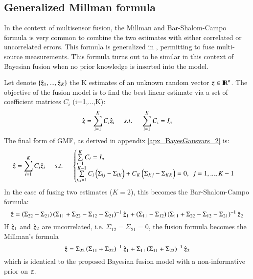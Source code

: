 \subsection{Generalized Millman formula}
In the context of multisensor fusion, the Millman and Bar-Shalom-Campo formula is very common to combine the two estimates with either correlated or uncorrelated errors. This formula is generalized in \cite{shin2006generalized}, permitting to fuse multi-source measurements. This formula turns out to be similar in this context of Bayesian fusion when no prior knowledge is inserted into the model. 

Let denote $ \left\lbrace \hat{\operatorname{\boldsymbol{z}} }_1,...,\hat{\operatorname{\boldsymbol{z}} }_K \right\rbrace  $ the K estimates of an unknown random vector $ \operatorname{\boldsymbol{z}}  \in {\rm I\!R}^n $. The objective of the fusion model is to find the best linear estimate via a set of coefficient matrices $ C_i $ (i=1,...,K):
\begin{equation}
\hat{\operatorname{\boldsymbol{z}} }=\sum\limits_{i=1}^{K}{C_i\hat{\operatorname{\boldsymbol{z}} }_i} \:\:\:\:\:\: s.t. \:\:\:\:\:\: \sum\limits_{i=1}^{K}{C_i}=I_n
\end{equation}
The final form of GMF, as derived in appendix \ref{apx_BayesGausvars_2} is: 
\begin{equation}
\hat{\operatorname{\boldsymbol{z}} }=\sum\limits_{i=1}^{K}{C_i\hat{\operatorname{\boldsymbol{z}} }_i} \:\:\:\:\:\: s.t. \:\:\:\:\:\: \begin{cases}
\sum\limits_{i=1}^{K}{C_i}=I_n\\
\sum\limits_{i,j=1}^{K-1}{C_i} \left(\Sigma_{ij}-\Sigma_{iK}\right)+C_K\left(\Sigma_{Kj}-\Sigma_{KK}\right) = 0, \:\: j=1,...,K-1
\end{cases}
\end{equation} 
In the case of fusing two estimates ($ K=2 $), this becomes the Bar-Shalom-Campo formula:
\begin{equation}
\hat{\operatorname{\boldsymbol{z}} }=\left(\Sigma_{22}-\Sigma_{21}\right)\left(\Sigma_{11}+\Sigma_{22}-\Sigma_{12}-\Sigma_{21}\right)^{-1} \hat{\operatorname{\boldsymbol{z}} }_1+\left(\Sigma_{11}-\Sigma_{12}\right)\left(\Sigma_{11}+\Sigma_{22}-\Sigma_{12}-\Sigma_{21}\right)^{-1}\hat{\operatorname{\boldsymbol{z}} }_2
\end{equation}
If $ \hat{\operatorname{\boldsymbol{z}} }_1 $ and $ \hat{\operatorname{\boldsymbol{z}} }_2 $ are uncorrelated, i.e. $ \Sigma_{12}=\Sigma_{21}=0 $, the fusion formula becomes the Millman's formula
\begin{equation}
\hat{\operatorname{\boldsymbol{z}} }=\Sigma_{22}\left(\Sigma_{11}+\Sigma_{22}\right)^{-1}\hat{\operatorname{\boldsymbol{z}} }_1+\Sigma_{11}\left(\Sigma_{11}+\Sigma_{22}\right)^{-1}\hat{\operatorname{\boldsymbol{z}} }_2
\end{equation}
which is identical to the proposed Bayesian fusion model with a non-informative prior on $ \operatorname{\boldsymbol{z}}  $.


